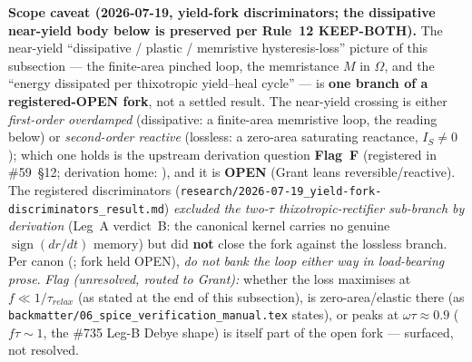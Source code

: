 \noindent\textbf{Scope caveat (2026-07-19, yield-fork discriminators; the dissipative near-yield body below is preserved per Rule~12 KEEP-BOTH).} The near-yield ``dissipative / plastic / memristive hysteresis-loss'' picture of this subsection --- the finite-area pinched loop, the memristance $M$ in $\Omega$, and the ``energy dissipated per thixotropic yield--heal cycle'' --- is \textbf{one branch of a registered-OPEN fork}, not a settled result. The near-yield crossing is either \emph{first-order overdamped} (dissipative: a finite-area memristive loop, the reading below) or \emph{second-order reactive} (lossless: a zero-area saturating reactance, $I_S \neq 0$); which one holds is the upstream derivation question \textbf{Flag~F} (registered in \#59~\S12; derivation home: ), and it is \textbf{OPEN} (Grant leans reversible/reactive). The registered discriminators (\texttt{research/2026-07-19\_yield-fork-discriminators\_result.md}) \emph{excluded the two-$\tau$ thixotropic-rectifier sub-branch by derivation} (Leg~A verdict~B: the canonical kernel carries no genuine $\operatorname{sign}(dr/dt)$ memory) but did \textbf{not} close the fork against the lossless branch. Per canon (; fork held OPEN), \emph{do not bank the loop either way in load-bearing prose}. \emph{Flag (unresolved, routed to Grant):} whether the loss maximises at $f \ll 1/\tau_{relax}$ (as stated at the end of this subsection), is zero-area/elastic there (as \texttt{backmatter/06\_spice\_verification\_manual.tex} states), or peaks at $\omega\tau \approx 0.9$ ($f\tau \sim 1$, the \#735 Leg-B Debye shape) is itself part of the open fork --- surfaced, not resolved.

